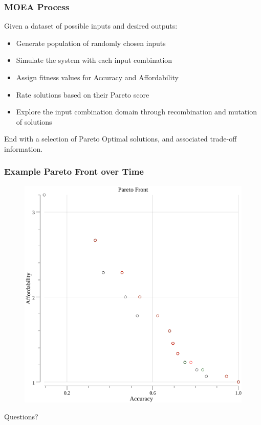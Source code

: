 \documentclass{beamer}
\begin{document}
\begin{frame}
\frametitle{MOEA Process}
Given a dataset of possible inputs and desired outputs:
\begin{itemize}
\item Generate population of randomly chosen inputs\pause
\item Simulate the system with each input combination\pause
\item Assign fitness values for Accuracy and Affordability\pause
\item Rate solutions based on their Pareto score\pause
\item Explore the input combination domain through recombination and mutation of solutions
\end{itemize}
End with a selection of Pareto Optimal solutions, and associated trade-off information.
\end{frame}

\begin{frame}
\frametitle{Example Pareto Front over Time}
\begin{figure}
\includegraphics[width=0.6\linewidth]{points.png}
\end{figure}
\end{frame}

\begin{frame}
\Huge{\centerline{Questions?}}
\end{frame}
\end{document}
